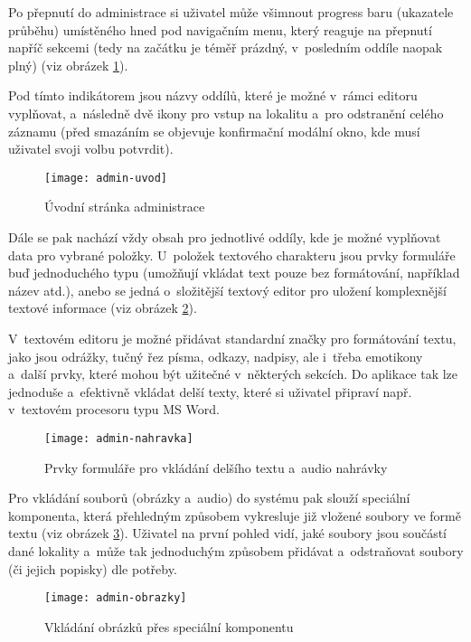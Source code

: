 Po přepnutí do administrace si uživatel může všimnout progress baru (ukazatele průběhu) umístěného hned pod navigačním menu, který reaguje na přepnutí napříč sekcemi (tedy na začátku je téměř prázdný, v~posledním oddíle naopak plný) (viz obrázek \ref{admin-uvod}).

Pod tímto indikátorem jsou názvy oddílů, které je možné v~rámci editoru vyplňovat, a~následně dvě ikony pro vstup na lokalitu a~pro odstranění celého záznamu (před smazáním se objevuje konfirmační modální okno, kde musí uživatel svoji volbu potvrdit).

\begin{figure}
    \centering
    \texttt{[image: admin-uvod]}  
    \caption{Úvodní stránka administrace}
    \label{admin-uvod}
\end{figure}

Dále se pak nachází vždy obsah pro jednotlivé oddíly, kde je možné vyplňovat data pro vybrané položky. U~položek textového charakteru jsou prvky formuláře buď jednoduchého typu (umožňují vkládat text pouze bez formátování, například název atd.), anebo se jedná o~složitější textový editor pro uložení komplexnější textové informace (viz obrázek \ref{admin-nahravka}).

V~textovém editoru je možné přidávat standardní značky pro formátování textu, jako jsou odrážky, tučný řez písma, odkazy, nadpisy, ale i~třeba emotikony a~další prvky, které mohou být užitečné v~některých sekcích. Do aplikace tak lze jednoduše a~efektivně vkládat delší texty, které si uživatel připraví např. v~textovém procesoru typu MS Word.

\begin{figure}
    \centering
    \texttt{[image: admin-nahravka]}  
    \caption{Prvky formuláře pro vkládání delšího textu a~audio nahrávky}
    \label{admin-nahravka}
\end{figure}

Pro vkládání souborů (obrázky a~audio) do systému pak slouží speciální komponenta, která přehledným způsobem vykresluje již vložené soubory ve formě textu (viz obrázek \ref{admin-obrazky}). Uživatel na první pohled vidí, jaké soubory jsou součástí dané lokality a~může tak jednoduchým způsobem přidávat a~odstraňovat soubory (či jejich popisky) dle potřeby.

\begin{figure}
    \centering
    \texttt{[image: admin-obrazky]}  
    \caption{Vkládání obrázků přes speciální komponentu}
    \label{admin-obrazky}
\end{figure}

